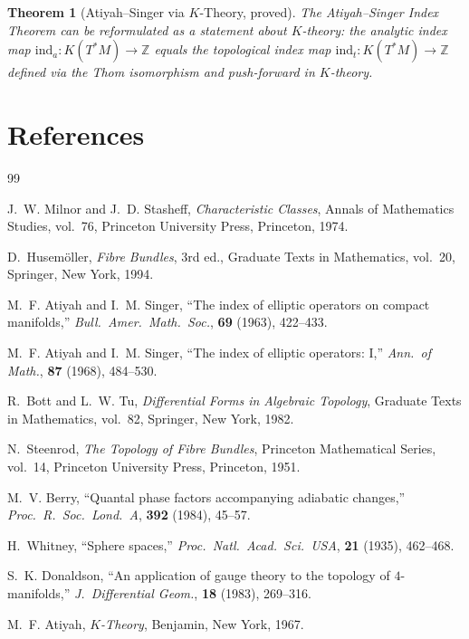 \documentclass[12pt,a4paper]{amsart}
\newtheorem{theorem}{Theorem}[section]
\theoremstyle{definition}
\begin{document}
\begin{theorem}[Atiyah--Singer via $K$-Theory, proved]
The Atiyah--Singer Index Theorem can be reformulated as a statement about
$K$-theory: the analytic index map $\mathrm{ind}_a \colon K(T^*M) \to \mathbb{Z}$
equals the topological index map $\mathrm{ind}_t \colon K(T^*M) \to \mathbb{Z}$
defined via the Thom isomorphism and push-forward in $K$-theory.
\end{theorem}

\section{References}

\begin{thebibliography}{99}

J.~W. Milnor and J.~D. Stasheff,
\textit{Characteristic Classes},
Annals of Mathematics Studies, vol.~76,
Princeton University Press, Princeton, 1974.

D.~Husem\"{o}ller,
\textit{Fibre Bundles},
3rd ed., Graduate Texts in Mathematics, vol.~20,
Springer, New York, 1994.

M.~F. Atiyah and I.~M. Singer,
``The index of elliptic operators on compact manifolds,''
\textit{Bull.\ Amer.\ Math.\ Soc.}, \textbf{69} (1963), 422--433.

M.~F. Atiyah and I.~M. Singer,
``The index of elliptic operators: I,''
\textit{Ann.\ of Math.}, \textbf{87} (1968), 484--530.

R.~Bott and L.~W. Tu,
\textit{Differential Forms in Algebraic Topology},
Graduate Texts in Mathematics, vol.~82,
Springer, New York, 1982.

N.~Steenrod,
\textit{The Topology of Fibre Bundles},
Princeton Mathematical Series, vol.~14,
Princeton University Press, Princeton, 1951.

M.~V. Berry,
``Quantal phase factors accompanying adiabatic changes,''
\textit{Proc.\ R.\ Soc.\ Lond.\ A}, \textbf{392} (1984), 45--57.

H.~Whitney,
``Sphere spaces,''
\textit{Proc.\ Natl.\ Acad.\ Sci.\ USA}, \textbf{21} (1935), 462--468.

S.~K. Donaldson,
``An application of gauge theory to the topology of $4$-manifolds,''
\textit{J.\ Differential Geom.}, \textbf{18} (1983), 269--316.

M.~F. Atiyah,
\textit{$K$-Theory},
Benjamin, New York, 1967.

\end{thebibliography}
\end{document}
